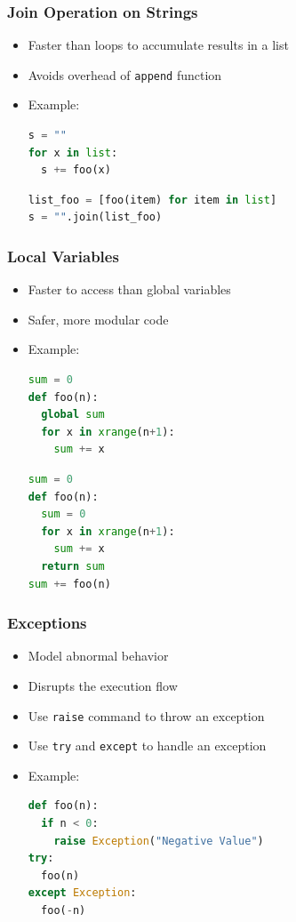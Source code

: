 \documentclass[xcolor=table,10pt,final]{beamer}
\begin{document}
\begin{frame}[fragile]
	\frametitle{Join Operation on Strings}
	\begin{itemize}
		\item Faster than loops to accumulate results in a list
		\item Avoids overhead of {\tt append} function
		\item Example:
			\begin{lstlisting}[language=Python]
s = ""
for x in list:
  s += foo(x)
			\end{lstlisting}
			\begin{lstlisting}[language=Python]
list_foo = [foo(item) for item in list]
s = "".join(list_foo)
			\end{lstlisting}
	\end{itemize}
\end{frame}


\begin{frame}[fragile]
	\frametitle{Local Variables}
	\begin{itemize}
		\item Faster to access than global variables
		\item Safer, more modular code
		\item Example:
			\begin{lstlisting}[language=Python]
sum = 0
def foo(n):
  global sum
  for x in xrange(n+1):
    sum += x
			\end{lstlisting}
			\begin{lstlisting}[language=Python]
sum = 0
def foo(n):
  sum = 0
  for x in xrange(n+1):
    sum += x
  return sum
sum += foo(n)
			\end{lstlisting}
	\end{itemize}
\end{frame}

\begin{frame}[fragile]
	\frametitle{Exceptions}
	\begin{itemize}
		\item Model abnormal behavior
		\item Disrupts the execution flow 
		\item Use {\tt raise} command to throw an exception
		\item Use {\tt try} and {\tt except} to handle an exception
		\item Example:
			\begin{lstlisting}[language=Python]
def foo(n):
  if n < 0:
    raise Exception("Negative Value")
try:
  foo(n)
except Exception:
  foo(-n)
			\end{lstlisting}
	\end{itemize}
\end{frame}
\end{document}
